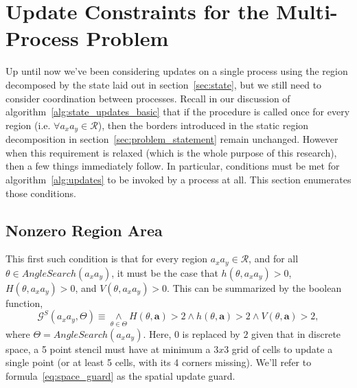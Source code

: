 

\section{Update Constraints for the Multi-Process Problem}

Up until now we've been considering updates on a single process using the region decomposed by the state
laid out in section~\ref{sec:state}, but we still need to consider coordination between processes.
Recall in our discussion of algorithm~\ref{alg:state_updates_basic} that if the procedure is called
once for every region (i.e. $\forall a_xa_y \in \mathcal{R}$), then the borders introduced in the static
region decomposition in section~\ref{sec:problem_statement} remain unchanged.  However when this requirement
is relaxed (which is the whole purpose of this research), then a few things immediately follow.  In
particular, conditions must be met for algorithm~\ref{alg:updates} to be invoked by a process at all.  This
section enumerates those conditions.

\subsection{Nonzero Region Area}

This first such condition is that for every region $a_xa_y \in \mathcal{R}$, and for all
$\theta\in AngleSearch(a_xa_y)$, it must be the case that $h(\theta,a_xa_y) > 0$,
$H(\theta,a_xa_y) > 0$, and $V(\theta,a_xa_y) > 0$.  This can be summarized by the
boolean function,
\begin{equation}
    \mathcal{G}^S(a_xa_y,\Theta) \equiv \underset{\theta \in \Theta}{\wedge}
    H(\theta,\mathbf{a}) > 2 \wedge
    h(\theta,\mathbf{a}) > 2 \wedge
    V(\theta,\mathbf{a}) > 2,
    \label{eq:space_guard}
\end{equation}
where $\Theta = AngleSearch(a_xa_y)$.
Here, $0$ is replaced by $2$ given that in discrete space, a 5 point stencil must have at
minimum a $3x3$ grid of cells to update a single point
(or at least 5 cells, with its 4 corners missing).  We'll refer to formula~\ref{eq:space_guard}
as the spatial update guard.

